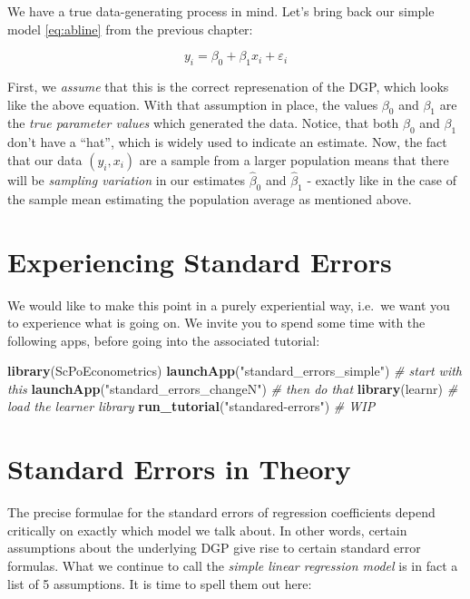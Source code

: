 \documentclass[]{book}
\newenvironment{Shaded}{\begin{snugshade}}{\end{snugshade}}
\newcommand{\KeywordTok}[1]{\textcolor[rgb]{0.13,0.29,0.53}{\textbf{#1}}}
\newcommand{\StringTok}[1]{\textcolor[rgb]{0.31,0.60,0.02}{#1}}
\newcommand{\CommentTok}[1]{\textcolor[rgb]{0.56,0.35,0.01}{\textit{#1}}}
\newcommand{\NormalTok}[1]{#1}
\theoremstyle{definition}
\theoremstyle{definition}
\theoremstyle{definition}
\theoremstyle{remark}
\begin{document}
We have a true data-generating process in mind. Let's bring back our
simple model \eqref{eq:abline} from the previous chapter:

\[
y_i = \beta_0 + \beta_1 x_i + \varepsilon_i \label{eq:abline-5}
\]

First, we \emph{assume} that this is the correct represenation of the
DGP, which looks like the above equation. With that assumption in place,
the values \(\beta_0\) and \(\beta_1\) are the \emph{true parameter
values} which generated the data. Notice, that both \(\beta_0\) and
\(\beta_1\) don't have a ``hat'', which is widely used to indicate an
estimate. Now, the fact that our data \((y_i,x_i)\) are a sample from a
larger population means that there will be \emph{sampling variation} in
our estimates \(\hat{\beta}_0\) and \(\hat{\beta}_1\) - exactly like in
the case of the sample mean estimating the population average as
mentioned above.

\section{Experiencing Standard
Errors}\label{experiencing-standard-errors}

We would like to make this point in a purely experiential way, i.e.~we
want you to experience what is going on. We invite you to spend some
time with the following apps, before going into the associated tutorial:

\begin{Shaded}
\begin{Highlighting}[]
\KeywordTok{library}\NormalTok{(ScPoEconometrics)}
\KeywordTok{launchApp}\NormalTok{(}\StringTok{"standard_errors_simple"}\NormalTok{) }\CommentTok{# start with this}
\KeywordTok{launchApp}\NormalTok{(}\StringTok{"standard_errors_changeN"}\NormalTok{)  }\CommentTok{# then do that}
\KeywordTok{library}\NormalTok{(learnr)   }\CommentTok{# load the learner library}
\KeywordTok{run_tutorial}\NormalTok{(}\StringTok{"standared-errors"}\NormalTok{)   }\CommentTok{# WIP}
\end{Highlighting}
\end{Shaded}

\section{Standard Errors in Theory}\label{standard-errors-in-theory}

The precise formulae for the standard errors of regression coefficients
depend critically on exactly which model we talk about. In other words,
certain assumptions about the underlying DGP give rise to certain
standard error formulas. What we continue to call the \emph{simple
linear regression model} is in fact a list of 5 assumptions. It is time
to spell them out here:
\end{document}
